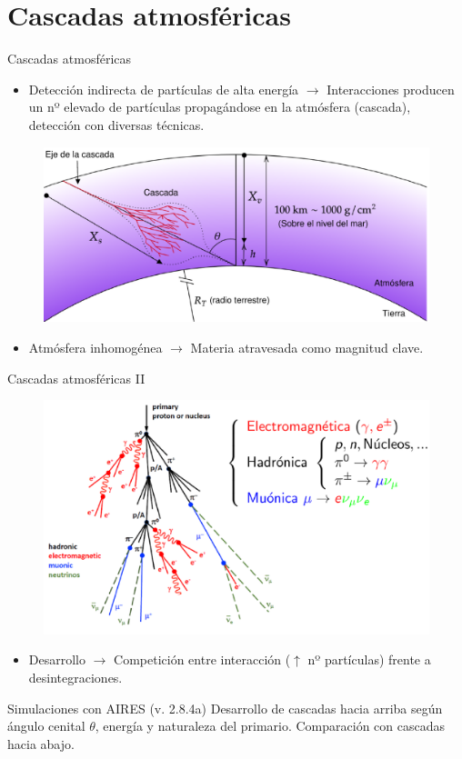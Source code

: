 \documentclass{beamer}
\begin{document}
	\section{Cascadas atmosféricas}
	\begin{frame}{Cascadas atmosféricas}
		\begin{itemize}
			\item Detección indirecta de partículas de alta energía $\rightarrow$ Interacciones producen un nº elevado de partículas propagándose en la atmósfera (cascada), detección con diversas técnicas.
		\end{itemize}
			\begin{figure}[H]
				\centering
				\includegraphics[width=.7\linewidth]{figures/cascadas/shower_params_v2}
			\end{figure}
		\begin{itemize}
			\item Atmósfera inhomogénea $\rightarrow$ Materia atravesada como magnitud clave. 
		\end{itemize}
	\end{frame}
\begin{frame}{Cascadas atmosféricas II}
		\begin{figure}[H]
			\centering
			\includegraphics[width=.65\linewidth]{figures/EAS_sketch}
		\end{figure}
		\color{black}
		\begin{itemize}
		\item Desarrollo $\rightarrow$ Competición entre interacción ($\uparrow$ nº partículas) frente a desintegraciones.
	\end{itemize}
\pause\begin{block}{\centering Simulaciones con AIRES (v. 2.8.4a)}
	\centering Desarrollo de cascadas hacia arriba según ángulo cenital $\theta$, energía y naturaleza del primario. Comparación con cascadas hacia abajo.
\end{block}
\end{frame}
\end{document}
